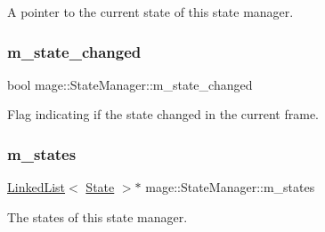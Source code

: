 A pointer to the current state of this state manager. \hypertarget{classmage_1_1_state_manager_a8e905ec2358a18a5b56d44cf79799afa}{}\label{classmage_1_1_state_manager_a8e905ec2358a18a5b56d44cf79799afa} 
\subsubsection{\texorpdfstring{m\+\_\+state\+\_\+changed}{m\_state\_changed}}
{\footnotesize\ttfamily bool mage\+::\+State\+Manager\+::m\+\_\+state\+\_\+changed\hspace{0.3cm}{\ttfamily [private]}}

Flag indicating if the state changed in the current frame. \hypertarget{classmage_1_1_state_manager_a88d005af690874d3ed3b8d4600525b9c}{}\label{classmage_1_1_state_manager_a88d005af690874d3ed3b8d4600525b9c} 
\subsubsection{\texorpdfstring{m\+\_\+states}{m\_states}}
{\footnotesize\ttfamily \hyperlink{classmage_1_1_linked_list}{Linked\+List}$<$ \hyperlink{classmage_1_1_state}{State} $>$$\ast$ mage\+::\+State\+Manager\+::m\+\_\+states\hspace{0.3cm}{\ttfamily [private]}}

The states of this state manager. 